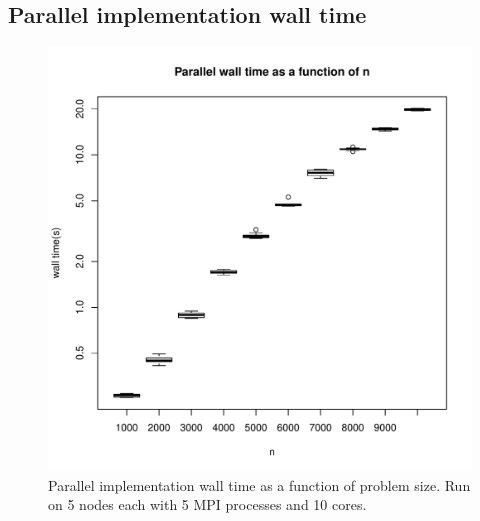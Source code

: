\documentclass{article}
\begin{document}
\subsection{Parallel implementation wall time}
\begin{figure}[H]
  \begin{center}
    \includegraphics[width=12cm]{../analysis/parallel_problem_size_mkl.pdf}
  \end{center}
  \caption{Parallel implementation wall time as a function of problem size. Run on 5 nodes each with 5 MPI processes and 10 cores.}
  \label{parallel_walltime1}
\end{figure}
\end{document}
